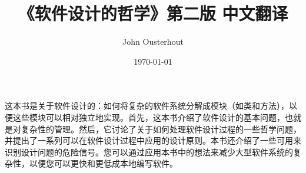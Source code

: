 \documentclass[UTF8,oneside,A4paper]{ctexbook}
\begin{document}
% 

\frontmatter
\title{《软件设计的哲学》第二版 中文翻译 }
\author{ John Ousterhout }
\date{\today}
\maketitle %
这本书是关于软件设计的：如何将复杂的软件系统分解成模块（如类和方法），以便这些模块可以相对独立地实现。首先，这本书介绍了软件设计的基本问题，也就是对复杂性的管理。然后，它讨论了关于如何处理软件设计过程的一些哲学问题，并提出了一系列可以在软件设计过程中应用的设计原则。本书还介绍了一些可用来识别设计问题的危险信号。您可以通过应用本书中的想法来减少大型软件系统的复杂性，以便您可以更快和更低成本地编写软件。


\tableofcontents
\mainmatter
























\end{document}
